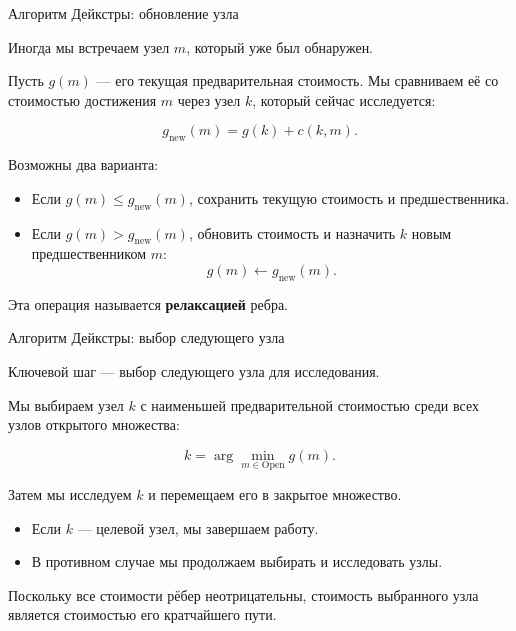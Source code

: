 \documentclass{beamer}
\begin{document}
	\begin{frame}{Алгоритм Дейкстры: обновление узла}
		\begin{flushleft}
			
			Иногда мы встречаем узел $m$, который уже
			был обнаружен.
			
			Пусть $g(m)$ — его текущая предварительная стоимость. Мы
			сравниваем её со стоимостью достижения $m$ через
			узел $k$, который сейчас исследуется:
			
			\[
			g_{\mathrm{new}}(m)=g(k)+c(k,m).
			\]
			
			Возможны два варианта:
			
			\begin{itemize}
				\item Если $g(m)\leq g_{\mathrm{new}}(m)$,
				сохранить текущую стоимость и предшественника.
				\item Если $g(m)>g_{\mathrm{new}}(m)$,
				обновить стоимость и назначить $k$ новым
				предшественником $m$:
				\[
				g(m)\leftarrow g_{\mathrm{new}}(m).
				\]
			\end{itemize}
			
			Эта операция называется \textbf{релаксацией}
			ребра.
			
		\end{flushleft}
	\end{frame}
	
	\begin{frame}{Алгоритм Дейкстры: выбор следующего узла}
		\begin{flushleft}
			
			Ключевой шаг — выбор следующего узла для исследования.
			
			Мы выбираем узел $k$ с наименьшей предварительной
			стоимостью среди всех узлов открытого множества:
			
			\[
			k=\arg\min_{m\in\mathrm{Open}} g(m).
			\]
			
			Затем мы исследуем $k$ и перемещаем его в закрытое множество.
			
			\begin{itemize}
				\item Если $k$ — целевой узел, мы завершаем работу.
				\item В противном случае мы продолжаем выбирать и
				исследовать узлы.
			\end{itemize}
			
			Поскольку все стоимости рёбер неотрицательны,
			стоимость выбранного узла является стоимостью его кратчайшего пути.
			
		\end{flushleft}
	\end{frame}
	
\end{document}
